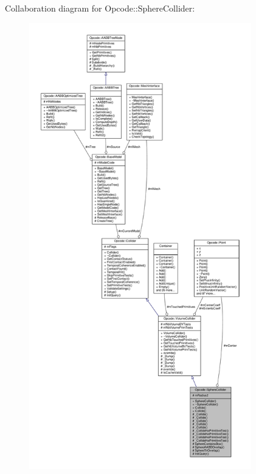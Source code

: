 Collaboration diagram for Opcode\+:\+:Sphere\+Collider\+:
\nopagebreak
\begin{figure}[H]
\begin{center}
\leavevmode
\includegraphics[height=550pt]{de/d15/classOpcode_1_1SphereCollider__coll__graph}
\end{center}
\end{figure}
